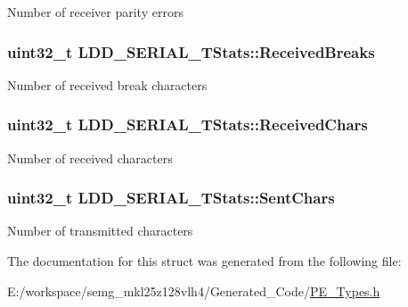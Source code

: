 Number of receiver parity errors \hypertarget{struct_l_d_d___s_e_r_i_a_l___t_stats_a45f707461666b974a6c3b5c948e66cf7}{
\subsubsection[{Received\-Breaks}]{\setlength{\rightskip}{0pt plus 5cm}uint32\-\_\-t L\-D\-D\-\_\-\-S\-E\-R\-I\-A\-L\-\_\-\-T\-Stats\-::\-Received\-Breaks}}\label{struct_l_d_d___s_e_r_i_a_l___t_stats_a45f707461666b974a6c3b5c948e66cf7}
Number of received break characters \hypertarget{struct_l_d_d___s_e_r_i_a_l___t_stats_a7dd5faa8bc6c15fde011eb6192ca6168}{
\subsubsection[{Received\-Chars}]{\setlength{\rightskip}{0pt plus 5cm}uint32\-\_\-t L\-D\-D\-\_\-\-S\-E\-R\-I\-A\-L\-\_\-\-T\-Stats\-::\-Received\-Chars}}\label{struct_l_d_d___s_e_r_i_a_l___t_stats_a7dd5faa8bc6c15fde011eb6192ca6168}
Number of received characters \hypertarget{struct_l_d_d___s_e_r_i_a_l___t_stats_a60198f844b85f9e73efaca83e32471cd}{
\subsubsection[{Sent\-Chars}]{\setlength{\rightskip}{0pt plus 5cm}uint32\-\_\-t L\-D\-D\-\_\-\-S\-E\-R\-I\-A\-L\-\_\-\-T\-Stats\-::\-Sent\-Chars}}\label{struct_l_d_d___s_e_r_i_a_l___t_stats_a60198f844b85f9e73efaca83e32471cd}
Number of transmitted characters 

The documentation for this struct was generated from the following file\-:\begin{DoxyCompactItemize}
\item 
E\-:/workspace/semg\-\_\-mkl25z128vlh4/\-Generated\-\_\-\-Code/\hyperlink{_p_e___types_8h}{P\-E\-\_\-\-Types.\-h}\end{DoxyCompactItemize}
